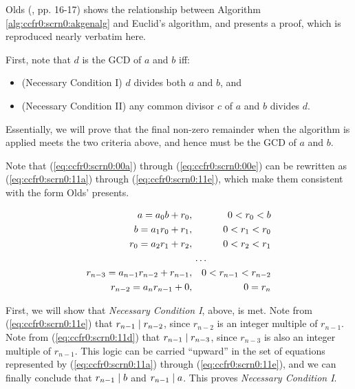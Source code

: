 \begin{vworkalgorithmproof}
Olds (\cite{bibref:b:OldsClassic}, pp. 16-17) shows the 
relationship between Algorithm 
\ref{alg:ccfr0:scrn0:akgenalg} and Euclid's algorithm, and presents
a proof, which is reproduced nearly verbatim here.

First, note that $d$ is the GCD of $a$ and $b$ iff:

\begin{itemize}
\item (Necessary Condition I) $d$ divides both $a$ and $b$, and
\item (Necessary Condition II) any common divisor $c$ of $a$ and $b$ divides $d$.
\end{itemize}

Essentially, we will prove that the final non-zero remainder
when the algorithm is applied meets the two criteria above,
and hence must be the GCD of $a$ and $b$.

Note that (\ref{eq:ccfr0:scrn0:00a}) through
(\ref{eq:ccfr0:scrn0:00e}) can be rewritten as
(\ref{eq:ccfr0:scrn0:11a}) through
(\ref{eq:ccfr0:scrn0:11e}), which make them
consistent with the form Olds' presents.

\begin{eqnarray}
\label{eq:ccfr0:scrn0:11a}
a   = a_0 b   +   r_0, && 0 < r_0 < b                          \\
\label{eq:ccfr0:scrn0:11b}
b   = a_1 r_0 +   r_1, && 0 < r_1 < r_0                        \\
\label{eq:ccfr0:scrn0:11c}
r_0 = a_2 r_1 +   r_2, && 0 < r_2 < r_1                        \\
\ldots{}\hspace{-1.67em}&&                     \nonumber       \\
\label{eq:ccfr0:scrn0:11d}
r_{n-3} = a_{n-1} r_{n-2} + r_{n-1}, && 0 < r_{n-1} < r_{n-2}  \\
\label{eq:ccfr0:scrn0:11e}
r_{n-2} = a_n     r_{n-1} + 0,       && 0 = r_n
\end{eqnarray}

First, we will show that \emph{Necessary Condition I}, above, is met.
Note from (\ref{eq:ccfr0:scrn0:11e}) that $r_{n-1} \mid r_{n-2}$,
since $r_{n-2}$ is an integer multiple of $r_{n-1}$.  Note from
(\ref{eq:ccfr0:scrn0:11d}) that $r_{n-1} \mid r_{n-3}$, since
$r_{n-3}$ is also an integer multiple of $r_{n-1}$.  This logic can
be carried ``upward'' in the set of equations represented
by (\ref{eq:ccfr0:scrn0:11a}) through (\ref{eq:ccfr0:scrn0:11e}),
and we can finally conclude that $r_{n-1} \mid b$ and
$r_{n-1} \mid a$.  This proves \emph{Necessary Condition I}.


\end{vworkalgorithmproof}
